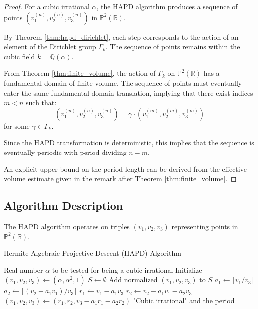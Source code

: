 \begin{proof}
For a cubic irrational $\alpha$, the HAPD algorithm produces a sequence of points $(v_1^{(n)}, v_2^{(n)}, v_3^{(n)})$ in $\mathbb{P}^2(\mathbb{R})$.

By Theorem \ref{thm:hapd_dirichlet}, each step corresponds to the action of an element of the Dirichlet group $\Gamma_k$. The sequence of points remains within the cubic field $k = \mathbb{Q}(\alpha)$.

From Theorem \ref{thm:finite_volume}, the action of $\Gamma_k$ on $\mathbb{P}^2(\mathbb{R})$ has a fundamental domain of finite volume. The sequence of points must eventually enter the same fundamental domain translation, implying that there exist indices $m < n$ such that:
\begin{equation}
(v_1^{(n)}, v_2^{(n)}, v_3^{(n)}) = \gamma \cdot (v_1^{(m)}, v_2^{(m)}, v_3^{(m)})
\end{equation}
for some $\gamma \in \Gamma_k$.

Since the HAPD transformation is deterministic, this implies that the sequence is eventually periodic with period dividing $n-m$.

An explicit upper bound on the period length can be derived from the effective volume estimate given in the remark after Theorem \ref{thm:finite_volume}.
\end{proof}

\subsection{Algorithm Description}

The HAPD algorithm operates on triples $(v_1, v_2, v_3)$ representing points in $\mathbb{P}^2(\mathbb{R})$.

\begin{algorithm}[H]
\caption{Hermite-Algebraic Projective Descent (HAPD) Algorithm}
\label{alg:hapd}
\begin{algorithmic}[1]
\Require Real number $\alpha$ to be tested for being a cubic irrational
\State Initialize $(v_1, v_2, v_3) \gets (\alpha, \alpha^2, 1)$
\State $S \gets \emptyset$ 
    \State Add normalized $(v_1, v_2, v_3)$ to $S$
    \State $a_1 \gets \lfloor v_1/v_3 \rfloor$
    \State $a_2 \gets \lfloor (v_2 - a_1v_1)/v_3 \rfloor$
    \State $r_1 \gets v_1 - a_1v_3$
    \State $r_2 \gets v_2 - a_1v_1 - a_2v_3$
    \State $(v_1, v_2, v_3) \gets (r_1, r_2, v_3 - a_1r_1 - a_2r_2)$
\EndWhile
\State \Return "Cubic irrational" and the period
\end{algorithmic}
\end{algorithm}

